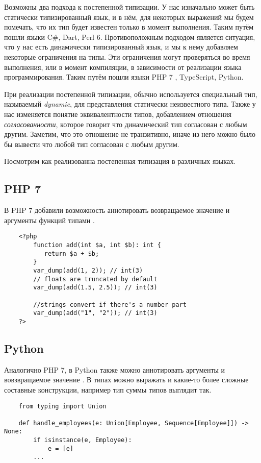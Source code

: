 Возможны два подхода к постепенной типизации. У нас изначально может быть статически типизированный язык, и в нём, для некоторых выражений мы будем помечать, что их тип будет известен только в момент выполнения. Таким путём пошли языки C{\#}, Dart, Perl 6. Противоположным подходом является ситуация, что у нас есть динамически типизированный язык, и мы к нему добавляем некоторые ограничения на типы. Эти ограничения могут проверяться во время выполнения, или в момент компиляции, в зависимости от реализации языка программирования. Таким путём пошли языки PHP 7 , TypeScript, Python.

При реализации постепенной типизации, обычно используется специальный тип, называемый \textit{dynamic}, для представления статически неизвестного типа. Также у нас изменяется понятие эквивалентности типов, добавлением отношения \textit{согласованности}, которое говорит что динамический тип согласован с любым другим. Заметим, что это отношение не транзитивно, иначе из него можно было бы вывести что любой тип согласован с любым другим.

Посмотрим как реализованна постепенная типизация в различных языках.

\subsection{PHP 7}

В PHP 7 добавили возможность аннотировать возвращаемое значение и аргументы функций типами \cite{wiki:phpScalarTypeHints}.

\begin{verbatim}
    <?php        
        function add(int $a, int $b): int {
           return $a + $b;
        }
        var_dump(add(1, 2)); // int(3)
        // floats are truncated by default
        var_dump(add(1.5, 2.5)); // int(3)
 
        //strings convert if there's a number part
        var_dump(add("1", "2")); // int(3)
    ?>
\end{verbatim}

\subsection{Python}
Аналогично PHP 7, в Python также можно аннотировать аргументы и вовзвращаемое значение \cite{wiki:pythonPep484TypeHints}. В типах можно выражать и какие-то более сложные составные конструкции, например тип суммы типов выглядит так.
\begin{verbatim}
    from typing import Union
    
    def handle_employees(e: Union[Employee, Sequence[Employee]]) -> None:
        if isinstance(e, Employee):
            e = [e]
        ...
\end{verbatim}